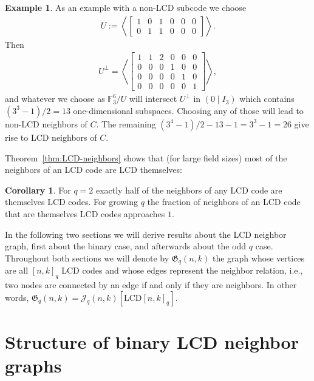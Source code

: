 \documentclass[11pt]{article}
\theoremstyle{definition}
\newtheorem{corollary}[theorem]{Corollary}
\newtheorem{example}[theorem]{Example}
\newcommand{\F}{\mathbb{F}}
\newcommand{\Ang}[1]{\left\langle#1\right\rangle}
\newcommand{\LCDq}[2]{\mathrm{LCD} {[#1, #2]}_q}
\newcommand{\CurJ}{\mathcal{J}}
\newcommand{\Jq}{\CurJ}
\newcommand{\Gq}{\mathfrak{G}}
\begin{document}
\begin{example}
	As an example with a non-LCD subcode we choose 
	\begin{align*}
		U:= \Ang{\begin{bmatrix}
			1 & 0 & 1 & 0 & 0 & 0\\
			0 & 1 & 1 & 0 & 0 & 0
		\end{bmatrix}}.
	\end{align*}
	Then 
	\begin{align*}
		U^\perp= \Ang{\begin{bmatrix}
			1 & 1 & 2 & 0 & 0 & 0\\
			0 & 0 & 0 & 1 & 0 & 0\\
			0 & 0 & 0 & 0 & 1 & 0\\
			0 & 0 & 0 & 0 & 0 & 1
		\end{bmatrix}},
	\end{align*}
	and whatever we choose as $\F_3^6 / U$ will intersect $U^\perp$ in $(0 \mid I_3)$ which contains $(3^3 - 1) / 2 = 13$ one-dimensional subspaces.
	Choosing any of those will lead to non-LCD neighbors of $C$.
	The remaining $(3^4 - 1) / 2 - 13 - 1 = 3^3 - 1 = 26$ give rise to LCD neighbors of $C$.
\end{example}

Theorem~\ref{thm:LCD-neighbors} shows that (for large field sizes) most of the neighbors of an LCD code are LCD themselves:
 
\begin{corollary}
	For $q = 2$ exactly half of the neighbors of any LCD code are themselves LCD codes.
	For growing $q$ the fraction of neighbors of an LCD code that are themselves LCD codes approaches $1$.
\end{corollary}

In the following two sections we will derive results about the LCD neighbor graph, first about the binary case, and afterwards about the odd $q$ case. 
Throughout both sections we will denote by $\Gq_q(n, k)$ the graph whose vertices are all ${[n, k]}_q$ LCD codes and whose edges represent the neighbor relation, i.e., two nodes are connected by an edge if and only if they are neighbors.
In other words, $\Gq_q(n, k) = \Jq_q(n, k)[\LCDq{n}{k}]$.


\section{Structure of binary LCD neighbor graphs}\label{sec:Structureq2}
\end{document}
